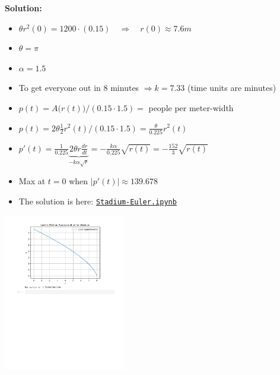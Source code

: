 \begin{solution}
\begin{slide}

\textbf{Solution:}

\begin{itemize}
\item $\theta r^2(0) = 1200 \cdot (0.15) \quad \Rightarrow \quad r(0) \approx 7.6m$
\item $\theta = \pi$
\item $\alpha = 1.5$
\item To get everyone out in 8 minutes $\Rightarrow k = 7.33$ (time units are minutes)
\item $p(t) = A\big(r(t)\big)/(0.15\cdot 1.5) = $ people per meter-width
\item $p(t) = 2\theta \frac12 r^2(t)/(0.15\cdot 1.5) = \frac{\theta}{0.225} r^2(t)$
\item $\displaystyle p'(t) = \frac{1}{0.225} \underbrace{2 \theta r\frac{dr}{dt}}_{- k \alpha \sqrt{r}} = -\frac{k \alpha}{0.225} \sqrt{r(t)} = - \frac{152}{3} \sqrt{r(t)}$ 
\item Max at $t=0$ when $|p'(t)| \approx 139.678$
\item The solution is here: \href{https://utoronto.syzygy.ca/jupyter/user-redirect/git-pull?repo=https://github.com/bigfatbernie/IBLMathModeling&subPath=book/python/Stadium-Euler.ipynb}{\tt Stadium-Euler.ipynb}
\end{itemize}

\includegraphics[width=0.4\textwidth]{python/Stadium-Euler-ipynb.pdf}


\end{slide}	
\end{solution}









